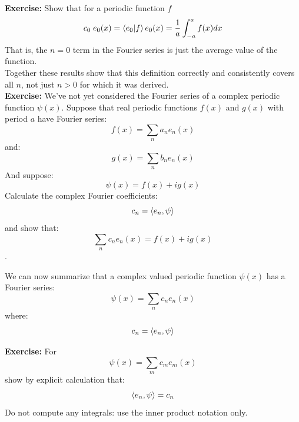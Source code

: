 \documentclass[12pt]{book}
\begin{document}
\noindent
{\bf Exercise:} Show that for a periodic function $f$ 
$$c_0 \; e_0(x) = \braket{e_0|f} e_0(x) = \frac{1}{a}\int_{-a}^{a} f(x) dx$$
\noindent
That is, the $n=0$ term in the Fourier series is just the average value of the function.\\

Together these results show that this definition correctly and consistently covers all $n$, not just $n>0$ for which it was derived.\\

\noindent
{\bf Exercise:}  We've not yet considered the Fourier series of a complex periodic function $\psi(x)$.  
Suppose that real periodic functions $f(x)$ and $g(x)$ with period $a$ have Fourier series:
$$f(x) = \sum_n a_n e_n(x)$$
and:
$$g(x) = \sum_n b_n e_n(x)$$
And suppose:
$$\psi(x) = f(x) + i g(x)$$
Calculate the complex Fourier coefficients:
$$c_n = \braket{e_n, \psi}$$
and show that:
$$\sum_n c_n e_n(x) = f(x) + i g(x)$$.

We can now summarize that a complex valued periodic function $\psi(x)$ has a Fourier series:
\begin{equation}
\psi(x) = \sum_n c_n e_n(x)
\end{equation}
where:
\begin{equation}
c_n = \braket{e_n, \psi}
\end{equation}

\noindent
{\bf Exercise:} For 
$$\psi(x) = \sum_m c_m e_m(x)$$
show by explicit calculation that:
$$\braket{e_n, \psi} = c_n$$
Do not compute any integrals: use the inner product notation only.
\end{document}
